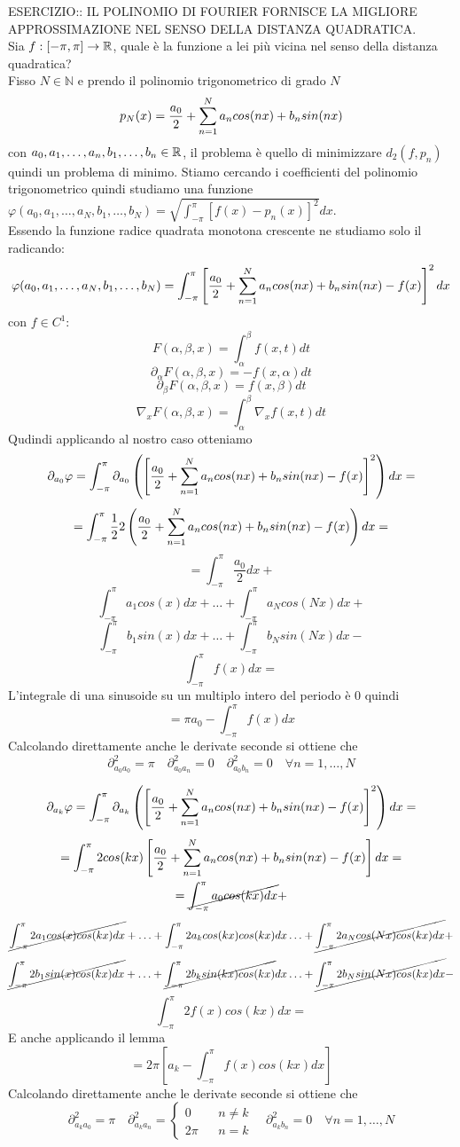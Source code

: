 ESERCIZIO:: IL POLINOMIO DI FOURIER FORNISCE LA MIGLIORE APPROSSIMAZIONE NEL SENSO DELLA DISTANZA QUADRATICA.\\
Sia $f:\left[-\pi,\pi\right]\to \mathbb{R}$, quale è la funzione a lei più vicina nel senso della distanza quadratica?\\
Fisso $N\in\mathbb{N}$ e prendo il polinomio trigonometrico di grado $N$
$$p_N(x)=\frac{a_0}{2}+\sum\limits_{n=1}^{N}a_{n}cos(nx)+b_{n}sin(nx)$$
con $a_0,a_1,\ldots,a_n,b_1,\ldots,b_n\in \mathbb{R}$, il problema è quello di minimizzare $d_2(f,p_n)$ quindi un problema di minimo. Stiamo cercando i coefficienti del polinomio trigonometrico quindi studiamo una funzione $\varphi(a_0,a_1,\ldots,a_N,b_1,\ldots,b_N) = \sqrt{\int_{-\pi}^{\pi}\left[f(x)-p_n(x)\right]^2}dx$.\\
Essendo la funzione radice quadrata monotona crescente ne studiamo solo il radicando:
$$\varphi(a_0,a_1,\ldots,a_N,b_1,\ldots,b_N)=\int_{-\pi}^{\pi}\left[\frac{a_0}{2}+\sum\limits_{n=1}^{N}a_{n}cos(nx)+b_{n}sin(nx)-f(x)\right]^2dx$$
\observation
con $f\in C^1$:
$$F(\alpha,\beta,x)=\int_{\alpha}^{\beta}f(x,t)dt$$
$$\partial_\alpha F(\alpha,\beta,x)=-f(x,\alpha)dt$$
$$\partial_\beta F(\alpha,\beta,x)=f(x,\beta)dt$$
$$\nabla_x F(\alpha,\beta,x)=\int_{\alpha}^{\beta}\nabla_xf(x,t)dt$$
Qudindi applicando al nostro caso otteniamo
$$\partial_{a_0}\varphi = \int_{-\pi}^{\pi}\partial_{a_0}\left(\left[\frac{a_0}{2}+\sum\limits_{n=1}^{N}a_{n}cos(nx)+b_{n}sin(nx)-f(x)\right]^2\right)dx=$$
$$ = \int_{-\pi}^{\pi} \frac{1}{2}2\left(\frac{a_0}{2}+\sum\limits_{n=1}^{N}a_{n}cos(nx)+b_{n}sin(nx)-f(x)\right)dx=$$
$$ =  \int_{-\pi}^{\pi} \frac{a_0}{2}dx + $$
$$\int_{-\pi}^{\pi} a_1cos(x)dx +
\ldots + 
\int_{-\pi}^{\pi} a_Ncos(Nx)dx + $$
$$\int_{-\pi}^{\pi} b_1sin(x)dx +
\ldots + 
\int_{-\pi}^{\pi} b_Nsin(Nx)dx - $$
$$ \int_{-\pi}^{\pi} f(x)dx = $$
L'integrale di una sinusoide su un multiplo intero del periodo è $0$ quindi
$$=\pi a_0-\int_{-\pi}^{\pi}f(x)dx$$
Calcolando direttamente anche le derivate seconde si ottiene che
$$\partial^2_{a_0a_0}=\pi\quad\partial^2_{a_0a_n}=0\quad\partial^2_{a_0b_n}=0\quad\forall n=1,\ldots,N$$

$$\partial_{a_k}\varphi = \int_{-\pi}^{\pi}\partial_{a_k}\left(\left[\frac{a_0}{2}+\sum\limits_{n=1}^{N}a_{n}cos(nx)+b_{n}sin(nx)-f(x)\right]^2\right)dx=$$
$$ = \int_{-\pi}^{\pi} 2cos(kx) \left[\frac{a_0}{2}+\sum\limits_{n=1}^{N}a_{n}cos(nx)+b_{n}sin(nx)-f(x)\right]dx=$$
$$ =  \cancel{\int_{-\pi}^{\pi} a_0cos(kx)dx} + $$
$$\cancel{\int_{-\pi}^{\pi} 2a_1cos(x)cos(kx)dx} +
\ldots + 
\int_{-\pi}^{\pi} 2a_kcos(kx)cos(kx)dx
\ldots + 
\cancel{\int_{-\pi}^{\pi} 2a_Ncos(Nx)cos(kx)dx} + $$
$$\cancel{\int_{-\pi}^{\pi} 2b_1sin(x)cos(kx)dx} +
\ldots + 
\cancel{\int_{-\pi}^{\pi} 2b_ksin(kx)cos(kx)}dx
\ldots + 
\cancel{\int_{-\pi}^{\pi} 2b_Nsin(Nx)cos(kx)dx} - $$
$$\int_{-\pi}^{\pi} 2f(x)cos(kx)dx = $$
E anche applicando il lemma
$$=2\pi\left[a_k-\int_{-\pi}^{\pi}f(x)cos(kx)dx\right]$$
Calcolando direttamente anche le derivate seconde si ottiene che
$$\partial^2_{a_ka_0}=\pi\quad\partial^2_{a_ka_n}=
\left\{\begin{matrix}
0&&n\ne k\\2\pi&&n=k
\end{matrix}\right.
\quad\partial^2_{a_kb_n}=0\quad\forall n=1,\ldots,N$$

